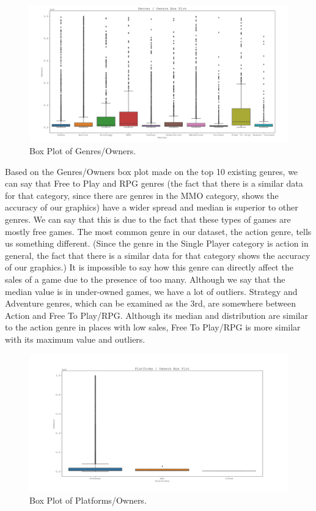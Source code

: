 \documentclass[conference]{IEEEtran}
\begin{document}
\begin{figure}[h]
  \includegraphics[width=\linewidth]{assets-2/genres_owners_box.png}
  \caption{Box Plot of Genres/Owners.}
  \label{fig:genres_owners1}
\end{figure}
\FloatBarrier

Based on the Genres/Owners box plot made on the top 10 existing genres, we can say that Free to Play and RPG genres (the fact that there is a similar data for that category, since there are genres in the MMO category, shows the accuracy of our graphics) have a wider spread and median is superior to other genres. We can say that this is due to the fact that these types of games are mostly free games. The most common genre in our dataset, the action genre, tells us something different. (Since the genre in the Single Player category is action in general, the fact that there is a similar data for that category shows the accuracy of our graphics.) It is impossible to say how this genre can directly affect the sales of a game due to the presence of too many. Although we say that the median value is in under-owned games, we have a lot of outliers. Strategy and Adventure genres, which can be examined as the 3rd, are somewhere between Action and Free To Play/RPG. Although its median and distribution are similar to the action genre in places with low sales, Free To Play/RPG is more similar with its maximum value and outliers.

\begin{figure}[h]
  \includegraphics[width=\linewidth]{assets-2/platforms_owners_box.png}
  \caption{Box Plot of Platforms/Owners.}
  \label{fig:platforms_owners1}
\end{figure}
\FloatBarrier
\end{document}
